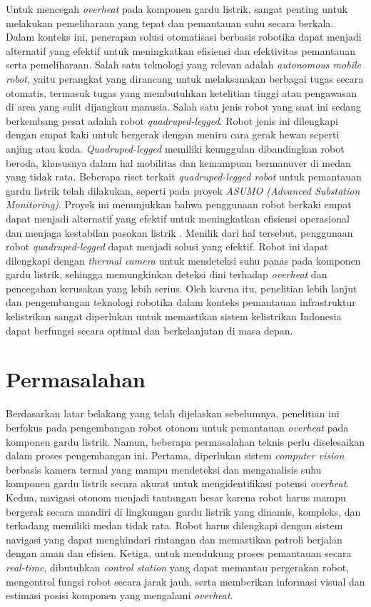 Untuk mencegah \emph{overheat} pada komponen gardu listrik, sangat penting untuk melakukan pemeliharaan yang tepat dan pemantauan suhu secara berkala. Dalam konteks ini, penerapan solusi otomatisasi berbasis robotika dapat menjadi alternatif yang efektif untuk meningkatkan efisiensi dan efektivitas pemantauan serta pemeliharaan. Salah satu teknologi yang relevan adalah \emph{autonomous mobile robot}, yaitu perangkat yang dirancang untuk melaksanakan berbagai tugas secara otomatis, termasuk tugas yang membutuhkan ketelitian tinggi atau pengawasan di area yang sulit dijangkau manusia. Salah satu jenis robot yang saat ini sedang berkembang pesat adalah robot \emph{quadruped-legged}. Robot jenis ini dilengkapi dengan empat kaki untuk bergerak dengan meniru cara gerak hewan seperti anjing atau kuda. \emph{Quadruped-legged} memiliki keunggulan dibandingkan robot beroda, khususnya dalam hal mobilitas dan kemampuan bermanuver di medan yang tidak rata. Beberapa riset terkait \emph{quadruped-legged robot} untuk pemantauan gardu listrik telah dilakukan, seperti pada proyek \emph{ASUMO (Advanced Substation Monitoring)}. Proyek ini menunjukkan bahwa penggunaan robot berkaki empat dapat menjadi alternatif yang efektif untuk meningkatkan efisiensi operasional dan menjaga kestabilan pasokan listrik \cite{ASUMO2023}. Menilik dari hal tersebut, penggunaan robot \emph{quadruped-legged} dapat menjadi solusi yang efektif. Robot ini dapat dilengkapi dengan \emph{thermal camera} untuk mendeteksi suhu panas pada komponen gardu listrik, sehingga memungkinkan deteksi dini terhadap \emph{overheat} dan pencegahan kerusakan yang lebih serius. Oleh karena itu, penelitian lebih lanjut dan pengembangan teknologi robotika dalam konteks pemantauan infrastruktur kelistrikan sangat diperlukan untuk memastikan sistem kelistrikan Indonesia dapat berfungsi secara optimal dan berkelanjutan di masa depan.

\section{Permasalahan}
Berdasarkan latar belakang yang telah dijelaskan sebelumnya, penelitian ini berfokus pada pengembangan robot otonom untuk pemantauan \emph{overheat} pada komponen gardu listrik. Namun, beberapa permasalahan teknis perlu diselesaikan dalam proses pengembangan ini. Pertama, diperlukan sistem \emph{computer vision} berbasis kamera termal yang mampu mendeteksi dan menganalisis suhu komponen gardu listrik secara akurat untuk mengidentifikasi potensi \emph{overheat}. Kedua, navigasi otonom menjadi tantangan besar karena robot harus mampu bergerak secara mandiri di lingkungan gardu listrik yang dinamis, kompleks, dan terkadang memiliki medan tidak rata. Robot harus dilengkapi dengan sistem navigasi yang dapat menghindari rintangan dan memastikan patroli berjalan dengan aman dan efisien. Ketiga, untuk mendukung proses pemantauan secara \emph{real-time}, dibutuhkan \emph{control station} yang dapat memantau pergerakan robot, mengontrol fungsi robot secara jarak jauh, serta memberikan informasi visual dan estimasi posisi komponen yang mengalami \emph{overheat}.

